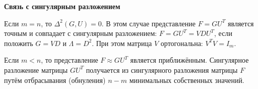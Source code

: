 {}\documentclass{article}
\begin{document}
\textbf{Связь с сингулярным разложением}

Если $m=n$, то $\Delta^2(G, U)=0$.
В этом случае представление $F=G U^T$ является точным и совпадает с сингулярным разложением:
$F=G U^T=V D U^T$, если положить $G=V D$ и $\Lambda=D^2$.
При этом матрица $V$ ортогональна: $V^T V=I_m$.

Если $m<n$, то представление $F \approx G U^T$ является приближённым.
Сингулярное разложение матрицы $G U^T$ получается из сингулярного разложения матрицы $F$ путём отбрасывания (обнуления)
$n-m$ минимальных собственных значений.
\end{document}

